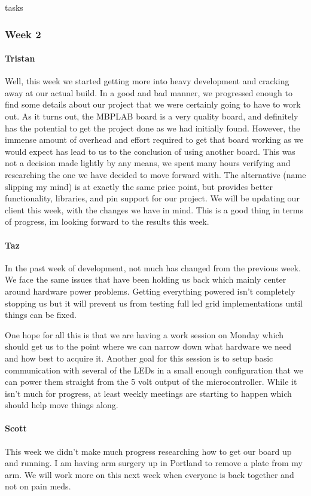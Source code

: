 tasks\documentclass[onecolumn, draftclsnofoot,10pt, compsoc]{IEEEtran}
\begin{document}
\subsubsection{Week 2}
\paragraph{Tristan}
Well, this week we started getting more into heavy development and cracking away at our actual build. In a good and bad manner, we progressed enough to find some details about our project that we were certainly going to have to work out. As it turns out, the MBPLAB board is a very quality board, and definitely has the potential to get the project done as we had initially found. However, the immense amount of overhead and effort required to get that board working as we would expect has lead to us to the conclusion of using another board. This was not a decision made lightly by any means, we spent many hours verifying and researching the one we have decided to move forward with. The alternative (name slipping my mind) is at exactly the same price point, but provides better functionality, libraries, and pin support for our project. We will be updating our client this week, with the changes we have in mind. This is a good thing in terms of progress, im looking forward to the results this week.
\paragraph{Taz}
In the past week of development, not much has changed from the previous week. We face the same issues that have been holding us back which mainly center around hardware power problems. Getting everything powered isn't completely stopping us but it will prevent us from testing full led grid implementations until things can be fixed.

One hope for all this is that we are having a work session on Monday which should get us to the point where we can narrow down what hardware we need and how best to acquire it. Another goal for this session is to setup basic communication with several of the LEDs in a small enough configuration that we can power them straight from the 5 volt output of the microcontroller. While it isn't much for progress, at least weekly meetings are starting to happen which should help move things along.
\paragraph{Scott}
This week we didn't make much progress researching how to get our board up and running. I am having arm surgery up in Portland to remove a plate from my arm. We will work more on this next week when everyone is back together and not on pain meds.
\end{document}
